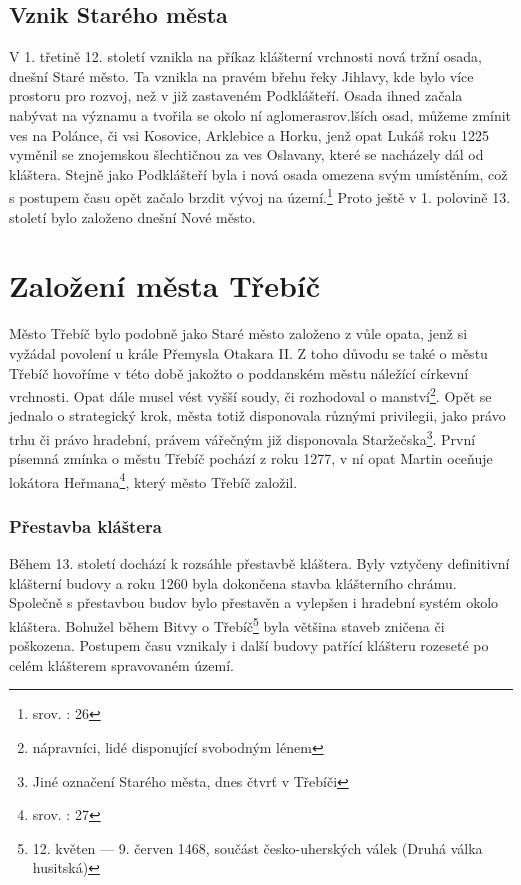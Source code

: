 \documentclass[a4paper,oneside,12p]{report}
\begin{document}
\subsection{Vznik Starého města}
V 1. třetině 12. století vznikla na příkaz klášterní vrchnosti nová tržní osada, dnešní Staré město.
Ta vznikla na pravém břehu řeky Jihlavy, kde bylo více prostoru pro rozvoj, než v již zastaveném Podklášteří.
Osada ihned začala nabývat na významu a tvořila se okolo ní aglomerasrov.lších osad, můžeme zmínit ves na Polánce, či vsi Kosovice, Arklebice a Horku, jenž opat Lukáš roku 1225 vyměnil se znojemskou šlechtičnou za ves Oslavany, které se nacházely dál od kláštera.
Stejně jako Podklášteří byla i nová osada omezena svým umístěním, což s postupem času opět začalo brzdit vývoj na území.\footnote{srov. \cite{Uhlir1978}: 26}
Proto ještě v 1. polovině 13. století bylo založeno dnešní Nové město.


\section{Založení města Třebíč}
Město Třebíč bylo podobně jako Staré město založeno z vůle opata, jenž si vyžádal povolení u krále Přemysla Otakara II.
Z toho důvodu se také o městu Třebíč hovoříme v této době jakožto o poddanském městu náležící církevní vrchnosti.
Opat dále musel vést vyšší soudy, či rozhodoval o manství\footnote{nápravníci, lidé disponující svobodným lénem}.
Opět se jednalo o strategický krok, města totiž disponovala různými privilegii, jako právo trhu či právo hradební, právem vářečným již disponovala Staržečska\footnote{Jiné označení Starého města, dnes čtvrť v Třebíči}.
První písemná zmínka o městu Třebíč pochází z roku 1277, v ní opat Martin oceňuje lokátora Heřmana\footnote{srov. \cite{Uhlir1978}: 27}, který město Třebíč založil.

\subsubsection{Přestavba kláštera}

Během 13. století dochází k rozsáhle přestavbě kláštera.
Byly vztyčeny definitivní klášterní budovy a roku 1260 byla dokončena stavba klášterního chrámu.
Společně s přestavbou budov bylo přestavěn a vylepšen i hradební systém okolo kláštera.
Bohužel během Bitvy o Třebíč\footnote{12. květen — 9. červen 1468, součást česko-uherských válek (Druhá válka husitská)} byla většina staveb zničena či poškozena.
Postupem času vznikaly i další budovy patřící klášteru rozeseté po celém klášterem spravovaném území.
\end{document}
